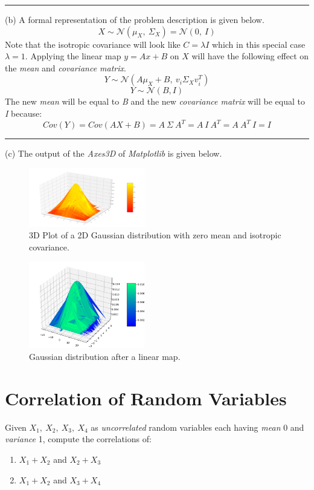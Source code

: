 \documentclass[12pt]{article}
\numberwithin{equation}{section}
\numberwithin{table}{section}
\numberwithin{figure}{section}
\begin{document}
\noindent\rule{\textwidth}{.5pt}
(b) A formal representation of the problem description is given below.
$$
	X \sim \mathcal{N}(\mu_X, \ \Sigma_X) = \mathcal{N}(0, \ I)
$$
Note that the isotropic covariance will look like $C=\lambda I$ which in this special case $\lambda = 1$. Applying the linear map $y = Ax + B$ on $X$ will have the following effect on the \textit{mean} and \textit{covariance matrix}.
$$
	Y \sim \mathcal{N}(A\mu_X + B, \ v_i \Sigma_X v_i^T)
$$
$$
	Y \sim \mathcal{N}(B, I)
$$
The new \textit{mean} will be equal to \textit{B} and the new \textit{covariance matrix} will be equal to \textit{I} because:
$$
	Cov(Y) = Cov(AX + B) = A\ \Sigma \ A^T = A\ I\ A^T = A\ A^T\ I = I
$$
\noindent\rule{\textwidth}{.5pt}
(c) The output of the \textit{Axes3D} of \textit{Matplotlib} is given below.
\begin{figure}[!h]\centering
	\includegraphics[width=0.45\textwidth]{multivariate_normal.png}
	\caption{3D Plot of a 2D Gaussian distribution with zero mean and isotropic covariance.}
	\label{figsolplot}
\end{figure}
\begin{figure}[!h]\centering
	\includegraphics[width=0.45\textwidth]{multivariate_normal_transformed.png}
	\caption{Gaussian distribution after a linear map.}
	\label{figsolplot}
\end{figure}
\newpage

\section{Correlation of Random Variables}
Given $X_1,\ X_2,\ X_3,\ X_4$ as \textit{uncorrelated} random variables each having \textit{mean} 0 and \textit{variance} 1, compute the correlations of:\\
\begin{enumerate}[label=(\alph*)]
	\item $X_1 + X_2$ and $X_2 + X_3$
	
	\item $X_1 + X_2$ and $X_3 + X_4$
\end{enumerate}
\end{document}
